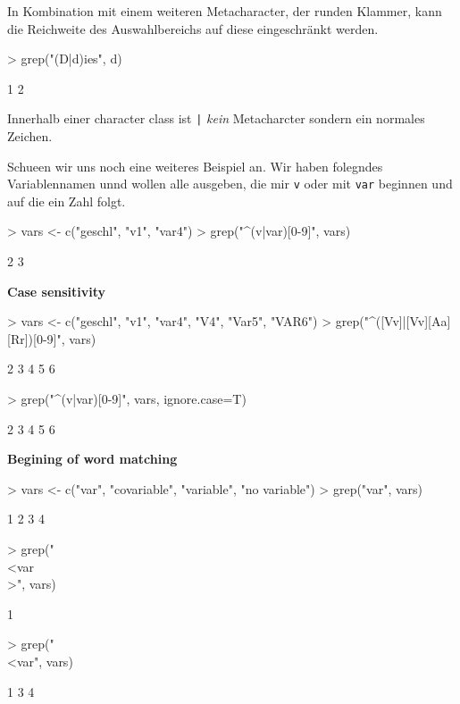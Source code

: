 \documentclass[a4paper]{report}
\begin{document}
In Kombination mit einem weiteren Metacharacter, der runden Klammer, kann die Reichweite des Auswahlbereichs auf diese eingeschränkt werden.

\begin{Schunk}
\begin{Sinput}
> grep("(D|d)ies", d)
\end{Sinput}
\begin{Soutput}
[1] 1 2
\end{Soutput}
\end{Schunk}

Innerhalb einer character class ist \verb!|! \emph{kein} Metacharcter sondern ein normales Zeichen.

Schueen wir uns noch eine weiteres Beispiel an. Wir haben folegndes Variablennamen unnd wollen alle ausgeben, die mir \texttt{v} oder mit \texttt{var} beginnen und auf die ein Zahl folgt.

\begin{Schunk}
\begin{Sinput}
> vars <- c("geschl", "v1", "var4")  
> grep("^(v|var)[0-9]", vars)
\end{Sinput}
\begin{Soutput}
[1] 2 3
\end{Soutput}
\end{Schunk}

\textbf{Case sensitivity} 

\begin{Schunk}
\begin{Sinput}
> vars <- c("geschl", "v1", "var4", "V4", "Var5", "VAR6")  
> grep("^([Vv]|[Vv][Aa][Rr])[0-9]", vars)
\end{Sinput}
\begin{Soutput}
[1] 2 3 4 5 6
\end{Soutput}
\begin{Sinput}
> grep("^(v|var)[0-9]", vars, ignore.case=T)
\end{Sinput}
\begin{Soutput}
[1] 2 3 4 5 6
\end{Soutput}
\end{Schunk}


\textbf{Begining of word matching}

\begin{Schunk}
\begin{Sinput}
> vars <- c("var", "covariable", "variable", "no variable")
> grep("var", vars) 
\end{Sinput}
\begin{Soutput}
[1] 1 2 3 4
\end{Soutput}
\begin{Sinput}
> grep("\\<var\\>", vars)
\end{Sinput}
\begin{Soutput}
[1] 1
\end{Soutput}
\begin{Sinput}
> grep("\\<var", vars)  
\end{Sinput}
\begin{Soutput}
[1] 1 3 4
\end{Soutput}
\end{Schunk}
\end{document}
